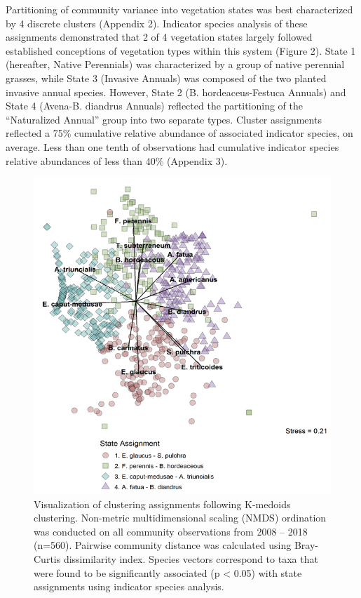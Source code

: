 \documentclass[twoside,12pt,final]{ucthesis-CA2012}
\begin{document}
\begin{ucmainmatter}
Partitioning of community variance into vegetation states was best characterized by 4 discrete clusters (Appendix 2).
Indicator species analysis of these assignments demonstrated that 2 of 4 vegetation states largely followed established conceptions of vegetation types within this system (Figure 2).
State 1 (hereafter, Native Perennials) was characterized by a group of native perennial grasses, while State 3 (Invasive Annuals) was composed of the two planted invasive annual species.
However, State 2 (B. hordeaceus-Festuca Annuals) and State 4 (Avena-B. diandrus Annuals) reflected the partitioning of the ``Naturalized Annual'' group into two separate types.
Cluster assignments reflected a 75\% cumulative relative abundance of associated indicator species, on average. Less than one tenth of observations had cumulative indicator species relative abundances of less than 40\% (Appendix 3).
\begin{figure}
\centering
\includegraphics{figure/Fig3_2.png}
\caption{Visualization of clustering assignments following K-medoids clustering. Non-metric multidimensional scaling (NMDS) ordination was conducted on all community observations from 2008 -- 2018 (n=560). Pairwise community distance was calculated using Bray-Curtis dissimilarity index. Species vectors correspond to taxa that were found to be significantly associated (p \textless{} 0.05) with state assignments using indicator species analysis. \label{fig-3-2}}

\end{figure}
\end{ucmainmatter}
\end{document}
